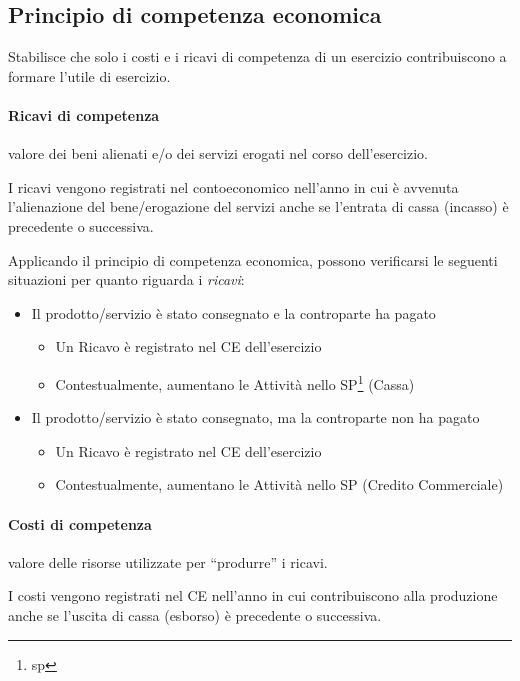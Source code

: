\documentclass[10pt,a4paper,fleqn,oneside]{book}
\begin{document}
\subsection{Principio di competenza economica}
Stabilisce che solo i costi e i ricavi di competenza di un esercizio contribuiscono
a formare l’utile di esercizio. 

\paragraph{Ricavi di competenza}
valore dei beni alienati e/o dei servizi erogati nel
corso dell’esercizio.

I ricavi vengono registrati nel \gls{contoeconomico} nell’anno in cui è avvenuta l’alienazione
del bene/erogazione del servizi anche se l’entrata di cassa (incasso) è
precedente o successiva.

Applicando il principio di competenza economica, possono verificarsi le
seguenti situazioni per quanto riguarda i \emph{ricavi}:
\begin{itemize}
    \item Il prodotto/servizio è stato consegnato e la controparte ha pagato
    \begin{itemize}
        \item Un Ricavo è registrato nel CE dell’esercizio
        \item Contestualmente, aumentano le Attività nello SP\footnote{\gls{sp}} (Cassa)
    \end{itemize}
    \item Il prodotto/servizio è stato consegnato, ma la controparte non ha pagato
    \begin{itemize}
        \item Un Ricavo è registrato nel CE dell’esercizio
        \item Contestualmente, aumentano le Attività nello SP (Credito Commerciale)
    \end{itemize}
\end{itemize}

\paragraph{Costi di competenza}
valore delle risorse utilizzate per ``produrre'' i ricavi.

I costi vengono registrati nel CE nell’anno in cui contribuiscono alla
produzione anche se l’uscita di cassa (esborso) è precedente o
successiva.
\end{document}
